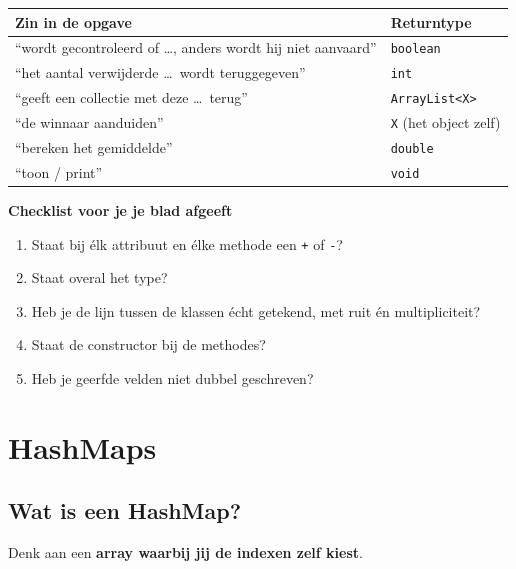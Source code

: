 \documentclass[a4paper,11pt]{article}
\begin{document}
\begin{center}
    \begin{tabular}{@{}p{6.2cm}l@{}}
        \toprule
        \textbf{Zin in de opgave}                                        & \textbf{Returntype}          \\
        \midrule
        ``wordt gecontroleerd of \dots, anders wordt hij niet aanvaard'' & \texttt{boolean}             \\
        ``het aantal verwijderde \dots\ wordt teruggegeven''             & \texttt{int}                 \\
        ``geeft een collectie met deze \dots\ terug''                    & \texttt{ArrayList<X>}        \\
        ``de winnaar aanduiden''                                         & \texttt{X} (het object zelf) \\
        ``bereken het gemiddelde''                                       & \texttt{double}              \\
        ``toon / print''                                                 & \texttt{void}                \\
        \bottomrule
    \end{tabular}
\end{center}

\textbf{Checklist voor je je blad afgeeft}
\begin{enumerate}
    \item Staat bij \'elk attribuut en \'elke methode een \texttt{+} of \texttt{-}?
    \item Staat overal het type?
    \item Heb je de lijn tussen de klassen \'echt getekend, met ruit \'en
          multipliciteit?
    \item Staat de constructor bij de methodes?
    \item Heb je geerfde velden niet dubbel geschreven?
\end{enumerate}


\section{HashMaps}
\label{sec:hashmap}

\subsection{Wat is een HashMap?}

Denk aan een \textbf{array waarbij jij de indexen zelf kiest}.
\end{document}
